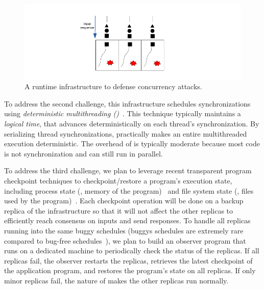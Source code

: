 \begin{figure}[ht]
\centering
\includegraphics[width=0.3\columnwidth]{figures/defense}
\vspace{-.05in}
\caption{{A runtime infrastructure to defense concurrency attacks.}} 
\label{fig:defense}
\vspace{-.2in}
\end{figure}





To address the second challenge, this infrastructure schedules synchronizations 
using \emph{deterministic 
multithreading (\dmt)}~\cite{dpj:oopsla09,dmp:asplos09,kendo:asplos09,
coredet:asplos10, 
dos:osdi10,ddos:asplos13,ics:oopsla13}.  This technique typically maintains a 
\emph{logical time}, that advances deterministically on each thread's 
synchronization. By serializing thread synchronizations, \dmt practically makes 
an entire multithreaded execution deterministic. The overhead of \dmt is 
typically moderate because most code is not synchronization and can still run 
in parallel.



To address the third challenge, we plan to leverage recent transparent 
program checkpoint techniques to checkpoint/restore a program's execution 
state, including process state (\eg, memory of the program)~\cite{criu} and 
file system state (\eg, files used by the program)~\cite{lxc}. Each checkpoint 
operation will be done on a backup replica of the infrastructure so that it 
will not affect the other replicas to efficiently reach consensus on inputs 
and send responses. To handle all replicas running into the same buggy 
schedules (buggys schedules are extremely rare compared to bug-free 
schedules~\cite{lu:concurrency-bugs}), we plan to build an observer program 
that runs on a dedicated machine to periodically check the status of the 
replicas. If all replicas fail, the observer restarts the replicas, 
retrieves the latest checkpoint of the application program, and restores the 
program's state on all replicas. If only minor replicas fail, the nature of 
\smr makes the other replicas run normally.

